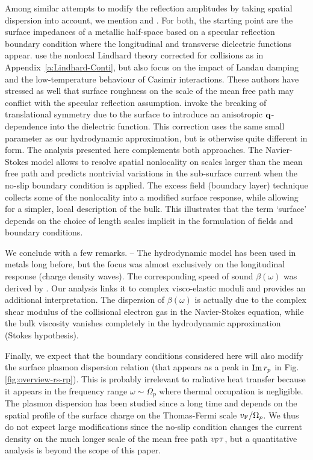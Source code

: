 \documentclass[11pt, oneside]{article}   	%
\def\OmegaP{\Omega_{p}}
\begin{document}
Among similar attempts to modify the reflection amplitudes by taking spatial dispersion into
account, we mention \citet{Reiche_2020a} and \citet{Klimchitskaya_2020b}. For both, 
the starting point are the surface impedances of a metallic half-space based on a specular 
reflection boundary condition \citep{garcia1979introduction, Ford_1984} where the longitudinal
and transverse dielectric functions appear. 
\citet{Reiche_2020a} use the nonlocal
Lindhard theory corrected for collisions as in Appendix~\ref{a:Lindhard-Conti}, 
but also focus on the impact of Landau damping and the low-temperature behaviour of 
Casimir interactions.
These authors have stressed as well that surface roughness on the scale of the mean free path 
may conflict with the specular reflection assumption.
\citet{Klimchitskaya_2020b} invoke the breaking of translational symmetry due to the 
surface to introduce an anisotropic ${\bf q}$-dependence into the dielectric function.
This correction uses the same small parameter as our hydrodynamic approximation, but is
otherwise quite different in form.
The analysis presented here complements both approaches. 
The Navier-Stokes model allows to resolve spatial nonlocality on scales larger than
the mean free path and predicts nontrivial variations in the sub-surface current when
the no-slip boundary condition is applied.
The excess field (boundary layer) technique collects some of the nonlocality 
into a modified surface response, while allowing for a simpler, local description of the 
bulk. This illustrates that the term `surface' depends on the choice of length scales 
implicit in the formulation of fields and boundary conditions.

We conclude with a few remarks. 
--
The hydrodynamic model has been used in metals long before, but the focus was almost exclusively on the longitudinal response (charge density waves). The corresponding speed of sound $\beta(\omega)$ was derived by \citet{Halevi_1995}. Our analysis links it to complex visco-elastic moduli \citep{Conti_1999} and provides an additional interpretation. The dispersion of $\beta(\omega)$ is actually due to the complex shear modulus of the collisional electron gas in the Navier-Stokes equation, while the bulk viscosity vanishes completely in the hydrodynamic approximation (Stokes hypothesis).

Finally, we expect that the boundary conditions considered here will also modify the surface plasmon dispersion relation (that appears as a peak in $\mathop{\rm Im} r_p$ in Fig.\,\ref{fig:overview-rs-rp}). This is probably irrelevant to radiative heat transfer because it appears in the frequency range $\omega \sim \OmegaP$ where thermal occupation is negligible. The plasmon dispersion has been studied since a long time \citep{garcia1979introduction, Halevi_1995} and depends on the spatial profile of the surface charge on the Thomas-Fermi scale $v_{\rm F} / \OmegaP$. We thus do not expect large modifications since the no-slip condition changes the current density on the much longer scale of the mean free path $v_{\rm F} \tau$, but a quantitative analysis is beyond the scope of this paper.
\end{document}
